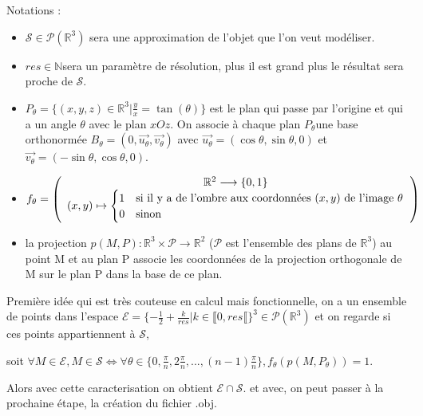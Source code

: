 \documentclass{article}
\begin{document}
Notations : 
\begin{itemize}
    \item $\mathcal{S}\in\mathcal{P}(\mathbb{R}^{3})$ sera une approximation
          de l'objet que l'on veut modéliser.
    \item $res\in\mathbb{N}$sera un paramètre de résolution, plus il est grand
          plus le résultat sera proche de $\mathcal{S}$.
    \item $P_{\theta}=\{(x,y,z)\in\mathbb{R}^{3}|\frac{y}{x}=\tan(\theta)\}$
          est le plan qui passe par l'origine et qui a un angle $\theta$ avec
          le plan $xOz$. On associe à chaque plan $P_{\theta}$une base orthonormée
          $B_{\theta}=(0,\overrightarrow{u_{\theta}},\overrightarrow{v_{\theta}})$
          avec $\overrightarrow{u_{\theta}}=(\cos\theta,\sin\theta,0)$ et $\overrightarrow{v_{\theta}}=(-\sin\theta,\cos\theta,0)$.
    \item $f_{\theta}=\left(\begin{array}{c}
                      \mathbb{R}^{2}\longrightarrow\{0,1\} \\
                      (x,y)\mapsto\begin{cases}
                          1 & \text{si il y a de l'ombre aux coordonnées \ensuremath{(x,y)} de l'image \ensuremath{\theta}} \\
                          0 & \text{sinon}
                      \end{cases}
                  \end{array}\right)$
    \item la projection $p(M,P):\mathbb{R}^{3}\times\mathcal{P}\longrightarrow\mathbb{R}^{2}$
          ($\mathcal{P}$ est l'ensemble des plans de $\mathbb{R}^{3}$) au
          point M et au plan P associe les coordonnées de la projection orthogonale
          de M sur le plan P dans la base de ce plan.
\end{itemize}
Première idée qui est très couteuse en calcul mais fonctionnelle,
on a un ensemble de points dans l'espace $\mathcal{E}=\{-\frac{1}{2}+\frac{k}{res}|k\in\llbracket0,res\llbracket\}^{3}\in\mathcal{P}(\mathbb{R}^{3})$
et on regarde si ces points appartiennent à $\mathcal{S}$, 

soit $\forall M\in\mathcal{E},M\in\mathcal{S}\Leftrightarrow\forall\theta\in\{0,\frac{\pi}{n},2\frac{\pi}{n},...,(n-1)\frac{\pi}{n}\},f_{\theta}(p(M,P_{\theta}))=1$.

Alors avec cette caracterisation on obtient $\mathcal{E}\cap\mathcal{S}$.
et avec, on peut passer à la prochaine étape, la création du fichier
.obj.
\end{document}
